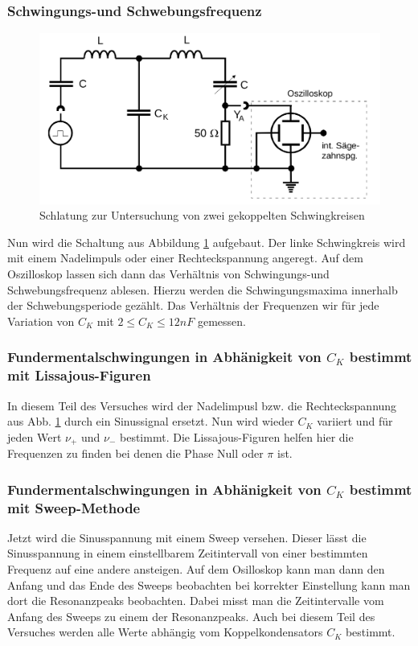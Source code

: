 \subsubsection{Schwingungs-und Schwebungsfrequenz}
\begin{figure}
  \centering
  \includegraphics[width=\textwidth]{./logos/Abb6.png}
  \caption{Schlatung zur Untersuchung von zwei gekoppelten Schwingkreisen}
  \label{fig:Abb6}
\end{figure}
\FloatBarrier
Nun wird die Schaltung aus Abbildung \ref{fig:Abb6} aufgebaut. Der linke Schwingkreis wird mit einem Nadelimpuls oder einer Rechteckspannung angeregt.
Auf dem Oszilloskop lassen sich dann das Verhältnis von Schwingungs-und Schwebungsfrequenz ablesen. Hierzu werden die Schwingungsmaxima innerhalb der Schwebungsperiode gezählt.
Das Verhältnis der Frequenzen wir für jede Variation von $C_K$ mit $ 2 \leq C_K \leq 12 nF $ gemessen.
\subsubsection{Fundermentalschwingungen in Abhänigkeit von $C_K$  bestimmt mit Lissajous-Figuren}
  In diesem Teil des Versuches wird der Nadelimpusl bzw. die Rechteckspannung aus Abb. \ref{fig:Abb6} durch ein Sinussignal ersetzt. Nun wird wieder $C_K$ variiert und für
  jeden Wert $ \nu_+$ und $\nu_-$ bestimmt. Die Lissajous-Figuren helfen hier die Frequenzen zu finden bei denen die Phase Null oder $ \pi $ ist.
\subsubsection{Fundermentalschwingungen in Abhänigkeit von $C_K$  bestimmt mit Sweep-Methode}
  Jetzt wird die Sinusspannung mit einem Sweep versehen. Dieser lässt die Sinusspannung in einem einstellbarem Zeitintervall von einer bestimmten Frequenz auf eine andere ansteigen.
  Auf dem Osilloskop kann man dann den Anfang und das Ende des Sweeps beobachten bei korrekter Einstellung kann man dort die Resonanzpeaks beobachten. Dabei misst man
  die Zeitintervalle vom Anfang des Sweeps zu einem der Resonanzpeaks. Auch bei diesem Teil des Versuches werden alle Werte abhängig vom Koppelkondensators $ C_K$ bestimmt.
